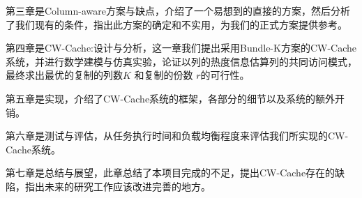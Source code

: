 \par 第三章是Column-aware方案与缺点，介绍了一个易想到的直接的方案，然后分析了我们现有的条件，指出此方案的确定和不实用，为我们的正式方案提供参考。

\par 第四章是CW-Cache:设计与分析，这一章我们提出采用Bundle-K方案的CW-Cache系统，并进行数学建模与仿真实验，论证以列的热度信息估算列的共同访问模式，最终求出最优的复制的列数$K$ 和复制的份数 $r$的可行性。

\par 第五章是实现，介绍了CW-Cache系统的框架，各部分的细节以及系统的额外开销。

\par 第六章是测试与评估，从任务执行时间和负载均衡程度来评估我们所实现的CW-Cache系统。

\par 第七章是总结与展望，此章总结了本项目完成的不足，提出CW-Cache存在的缺陷，指出未来的研究工作应该改进完善的地方。
